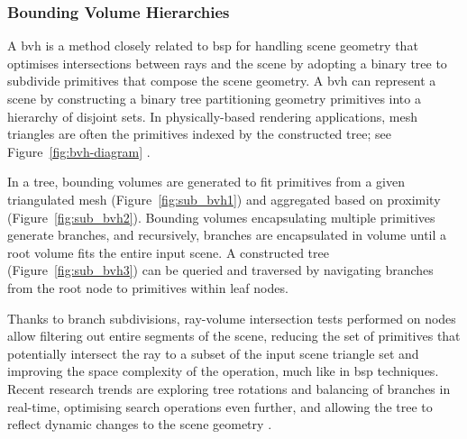 \subsubsection{Bounding Volume Hierarchies}
A \acrfull{bvh} is a method closely related to \acrshort{bsp} for handling scene geometry that optimises intersections between rays and the scene by adopting a binary tree to subdivide primitives that compose the scene geometry. A \acrshort{bvh} can represent a scene by constructing a binary tree partitioning geometry primitives into a hierarchy of disjoint sets. In physically-based rendering applications, mesh triangles are often the primitives indexed by the constructed tree; see Figure~\ref{fig:bvh-diagram} \citep{pharr2023physically}.\par
In a tree, bounding volumes are generated to fit primitives from a given triangulated mesh (Figure~\ref{fig:sub_bvh1}) and aggregated based on proximity (Figure~\ref{fig:sub_bvh2}). Bounding volumes encapsulating multiple primitives generate branches, and recursively, branches are encapsulated in volume until a root volume fits the entire input scene. A constructed tree (Figure~\ref{fig:sub_bvh3}) can be queried and traversed by navigating branches from the root node to primitives within leaf nodes.\par
Thanks to branch subdivisions, ray-volume intersection tests performed on nodes allow filtering out entire segments of the scene, reducing the set of primitives that potentially intersect the ray to a subset of the input scene triangle set and improving the space complexity of the operation, much like in \acrshort{bsp} techniques. Recent research trends are exploring tree rotations and balancing of branches in real-time, optimising search operations even further, and allowing the tree to reflect dynamic changes to the scene geometry \citep{kopta2012fast}.
 

